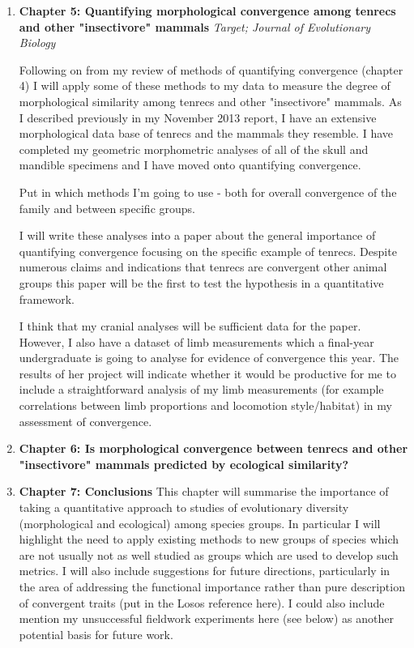 \documentclass[12pt,a4paper]{article}
\begin{document}
\begin{enumerate}


\item \textbf{Chapter 5: Quantifying morphological convergence among tenrecs and other "insectivore" mammals}
\textit{Target; Journal of Evolutionary Biology}

Following on from my review of methods of quantifying convergence (chapter 4) I will apply some of these methods to my data to measure the degree of morphological similarity among tenrecs and other "insectivore" mammals.
As I described previously in my November 2013 report, I have an extensive morphological data base of tenrecs and the mammals they resemble. I have completed my geometric morphometric analyses of all of the skull and mandible specimens and I have moved onto quantifying convergence.


Put in which methods I'm going to use - both for overall convergence of the family and between specific groups.

I will write these analyses into a paper about the general importance of quantifying convergence focusing on the specific example of tenrecs. Despite numerous claims and indications that tenrecs are convergent other animal groups \citep[e.g.][]{Olson2013, Eisenberg1969, Soarimalala2011} this paper will be the first to test the hypothesis in a quantitative framework.

I think that my cranial analyses will be sufficient data for the paper. However, I also have a dataset of limb measurements which a final-year undergraduate is going to analyse for evidence of convergence this year. The results of her project will indicate whether it would be productive for me to include a straightforward analysis of my limb measurements (for example correlations between limb proportions and locomotion style/habitat) in my assessment of convergence.


\item \textbf{Chapter 6: Is morphological convergence between tenrecs and other "insectivore" mammals predicted by ecological similarity?}



\item \textbf{Chapter 7: Conclusions}
This chapter will summarise the importance of taking a quantitative approach to studies of evolutionary diversity (morphological and ecological) among species groups. In particular I will highlight the need to apply existing methods to new groups of species which are not usually not as well studied as groups which are used to develop such metrics. I will also include suggestions for future directions, particularly in the area of addressing the functional importance rather than pure description of convergent traits (put in the Losos reference here). I could also include mention my unsuccessful fieldwork experiments here (see below) as another potential basis for future work. 

\end{enumerate}
\end{document}
